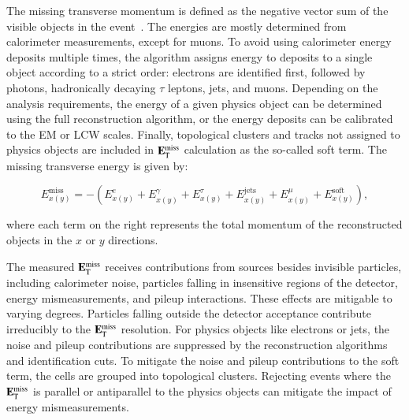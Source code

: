 The missing transverse momentum is defined as the negative vector sum of the visible objects in the event~\cite{TheATLASCollaboration:2012jy,TheATLASCollaboration:2013ua}. The energies are mostly determined from calorimeter measurements, except for muons. To avoid using calorimeter energy deposits multiple times, the algorithm assigns energy to deposits to a single object according to a strict order: electrons are identified first, followed by photons, hadronically decaying $\tau$ leptons, jets, and muons. Depending on the analysis requirements, the energy of a given physics object can be determined using the full reconstruction algorithm, or the energy deposits can be calibrated to the EM or LCW scales. Finally, topological clusters and tracks not assigned to physics objects are included in $\mathbf{E}_{\mathrm{T}}^{\mathrm{miss}}$ calculation as the so-called soft term. The missing transverse energy is given by:

\begin{equation}\label{eqn:reco-met}
	E_{x(y)}^{\mathrm{miss}} = -\left(E_{x(y)}^{e} + E_{x(y)}^{\gamma} + E_{x(y)}^{\tau} + E_{x(y)}^{\mathrm{jets}} + E_{x(y)}^{\mu} + E_{x(y)}^{\mathrm{soft}}\right),
\end{equation}

where each term on the right represents the total momentum of the reconstructed objects in the $x$ or $y$ directions.

The measured $\mathbf{E}_{\mathrm{T}}^{\mathrm{miss}}$ receives contributions from sources besides invisible particles, including calorimeter noise, particles falling in insensitive regions of the detector, energy mismeasurements, and pileup interactions. These effects are mitigable to varying degrees. Particles falling outside the detector acceptance contribute irreducibly to the $\mathbf{E}_{\mathrm{T}}^{\mathrm{miss}}$ resolution. For physics objects like electrons or jets, the noise and pileup contributions are suppressed by the reconstruction algorithms and identification cuts. To mitigate the noise and pileup contributions to the soft term, the cells are grouped into topological clusters. Rejecting events where the $\mathbf{E}_{\mathrm{T}}^{\mathrm{miss}}$ is parallel or antiparallel to the physics objects can mitigate the impact of energy mismeasurements. 




